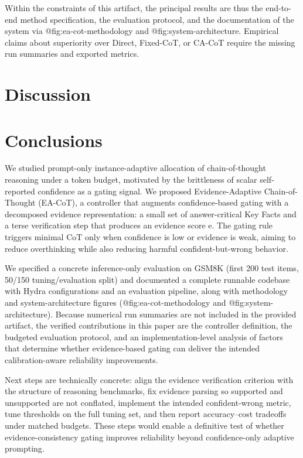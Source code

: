 \documentclass[journal,article,submit,pdftex,moreauthors]{Definitions/mdpi}
\begin{document}
Within the constraints of this artifact, the principal results are thus the end-to-end method specification, the evaluation protocol, and the documentation of the system via @fig:ea-cot-methodology and @fig:system-architecture. Empirical claims about superiority over Direct, Fixed-CoT, or CA-CoT require the missing run summaries and exported metrics.

\section{Discussion}



\section{Conclusions}

We studied prompt-only instance-adaptive allocation of chain-of-thought reasoning under a token budget, motivated by the brittleness of scalar self-reported confidence as a gating signal. We proposed Evidence-Adaptive Chain-of-Thought (EA-CoT), a controller that augments confidence-based gating with a decomposed evidence representation: a small set of answer-critical Key Facts and a terse verification step that produces an evidence score e. The gating rule triggers minimal CoT only when confidence is low or evidence is weak, aiming to reduce overthinking while also reducing harmful confident-but-wrong behavior.

We specified a concrete inference-only evaluation on GSM8K (first 200 test items, 50/150 tuning/evaluation split) and documented a complete runnable codebase with Hydra configurations and an evaluation pipeline, along with methodology and system-architecture figures (@fig:ea-cot-methodology and @fig:system-architecture). Because numerical run summaries are not included in the provided artifact, the verified contributions in this paper are the controller definition, the budgeted evaluation protocol, and an implementation-level analysis of factors that determine whether evidence-based gating can deliver the intended calibration-aware reliability improvements.

Next steps are technically concrete: align the evidence verification criterion with the structure of reasoning benchmarks, fix evidence parsing so supported and unsupported are not conflated, implement the intended confident-wrong metric, tune thresholds on the full tuning set, and then report accuracy–cost tradeoffs under matched budgets. These steps would enable a definitive test of whether evidence-consistency gating improves reliability beyond confidence-only adaptive prompting.
\end{document}
